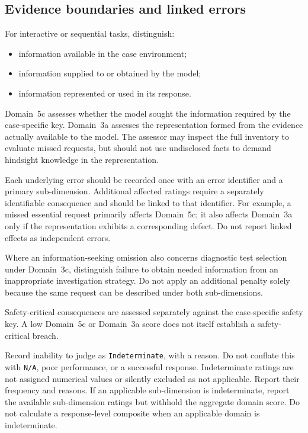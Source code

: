 \documentclass{article}
\begin{document}
\subsection*{Evidence boundaries and linked errors}

For interactive or sequential tasks, distinguish:
\begin{itemize}
\item information available in the case environment;
\item information supplied to or obtained by the model;
\item information represented or used in its response.
\end{itemize}

Domain~5c assesses whether the model sought the information
required by the case-specific key. Domain~3a assesses the
representation formed from the evidence actually available
to the model. The assessor may inspect the full inventory to
evaluate missed requests, but should not use undisclosed facts
to demand hindsight knowledge in the representation.

Each underlying error should be recorded once with an error
identifier and a primary sub-dimension. Additional affected
ratings require a separately identifiable consequence and
should be linked to that identifier. For example, a missed
essential request primarily affects Domain~5c; it also affects
Domain~3a only if the representation exhibits a corresponding
defect. Do not report linked effects as independent errors.

Where an information-seeking omission also concerns diagnostic
test selection under Domain~3c, distinguish failure to obtain
needed information from an inappropriate investigation strategy.
Do not apply an additional penalty solely because the same
request can be described under both sub-dimensions.

Safety-critical consequences are assessed separately against
the case-specific safety key. A low Domain~5c or Domain~3a
score does not itself establish a safety-critical breach.

Record inability to judge as \texttt{Indeterminate}, with a
reason. Do not conflate this with \texttt{N/A}, poor performance,
or a successful response. Indeterminate ratings are not assigned
numerical values or silently excluded as not applicable.
Report their frequency and reasons. If an applicable
sub-dimension is indeterminate, report the available
sub-dimension ratings but withhold the aggregate domain score.
Do not calculate a response-level composite when an applicable
domain is indeterminate.
\end{document}
